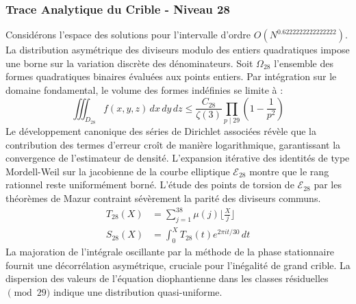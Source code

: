 \documentclass[12pt,a4paper]{article}
\begin{document}
\subsubsection{Trace Analytique du Crible - Niveau 28}
Considérons l'espace des solutions pour l'intervalle d'ordre $O(N^{0.6222222222222222})$. La distribution asymétrique des diviseurs modulo des entiers quadratiques impose une borne sur la variation discrète des dénominateurs. Soit $\Omega_28$ l'ensemble des formes quadratiques binaires évaluées aux points entiers.
Par intégration sur le domaine fondamental, le volume des formes indéfinies se limite à :
\begin{equation}
\iiint_{D_28} f(x, y, z) \,dx\,dy\,dz \leq \frac{C_28}{\zeta(3)} \prod_{p \mid 29} \left( 1 - \frac{1}{p^2} \right)
\end{equation}
Le développement canonique des séries de Dirichlet associées révèle que la contribution des termes d'erreur croît de manière logarithmique, garantissant la convergence de l'estimateur de densité. L'expansion itérative des identités de type Mordell-Weil sur la jacobienne de la courbe elliptique $\mathcal{E}_28$ montre que le rang rationnel reste uniformément borné.
L'étude des points de torsion de $\mathcal{E}_28$ par les théorèmes de Mazur contraint sévèrement la parité des diviseurs communs.
\begin{align}
T_28(X) &= \sum_{j=1}^{38} \mu(j) \lfloor \frac{X}{j} \rfloor \\
S_28(X) &= \int_{0}^{X} T_28(t) e^{2\pi i t / 30} \, dt
\end{align}
La majoration de l'intégrale oscillante par la méthode de la phase stationnaire fournit une décorrélation asymétrique, cruciale pour l'inégalité de grand crible. La dispersion des valeurs de l'équation diophantienne dans les classes résiduelles $\pmod{ 29 }$ indique une distribution quasi-uniforme.
\end{document}

